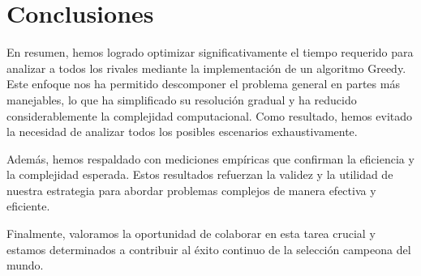 \section{Conclusiones}

En resumen, hemos logrado optimizar significativamente el tiempo requerido para analizar a todos los rivales mediante la implementación de un algoritmo Greedy. Este enfoque nos ha permitido descomponer el problema general en partes más manejables, lo que ha simplificado su resolución gradual y ha reducido considerablemente la complejidad computacional. Como resultado, hemos evitado la necesidad de analizar todos los posibles escenarios exhaustivamente.

Además, hemos respaldado con mediciones empíricas que confirman la eficiencia y la complejidad esperada. Estos resultados refuerzan la validez y la utilidad de nuestra estrategia para abordar problemas complejos de manera efectiva y eficiente.


Finalmente, valoramos la oportunidad de colaborar en esta tarea crucial y estamos determinados a contribuir al éxito continuo de la selección campeona del mundo.
